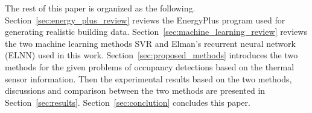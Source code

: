 The rest of this paper is organized as the following.
Section~\ref{sec:energy_plus_review} reviews the EnergyPlus program used for
generating realistic building data. Section~\ref{sec:machine_learning_review}
reviews the two machine learning methods SVR and Elman's recurrent neural
network (ELNN) used in this work. Section~\ref{sec:proposed_methods} introduces
the two methods for the given problems of occupancy detections based on the
thermal sensor information. Then the experimental results based on the two
methods, discussions and comparison between the two methods are presented in
Section~\ref{sec:results}. Section~\ref{sec:conclution} concludes this paper.
